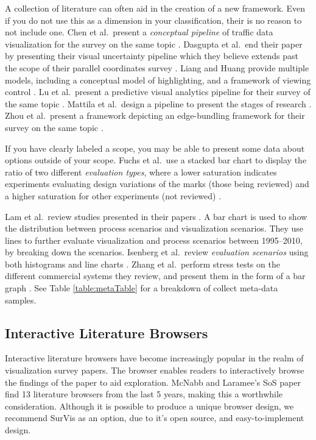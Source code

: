 A collection of literature can often aid in the creation of a new framework. Even if you do not use this as a dimension in your classification, their is no reason to not include one. Chen et al.\ present a \textit{conceptual pipeline} of traffic data visualization for the survey on the same topic \cite{chen2015survey}. Dasgupta et al.\ end their paper by presenting their visual uncertainty pipeline which they believe extends past the scope of their parallel coordinates survey \cite{dasgupta2012conceptualizing}. Liang and Huang provide multiple models, including a conceptual model of highlighting, and a framework of viewing control \cite{liang2010highlighting}. Lu et al.\  present a predictive visual analytics pipeline for their survey of the same topic \cite{lu2016recent}.  Mattila et al.\ design a pipeline to present the stages of research \cite{mattila2016software}. Zhou et al.\ present a framework depicting an edge-bundling framework for their survey on the same topic \cite{zhou2013edge}.

If you have clearly labeled a scope, you may be able to present some data about options outside of your scope. Fuchs et al.\ use a stacked bar chart to display the ratio of two different \textit{evaluation types}, where a lower saturation indicates experiments evaluating design variations of the marks (those being reviewed) and a higher saturation for other experiments (not reviewed) \cite{fuchs2016systematic}.

 Lam et al.\ review studies presented in their papers  \cite{lam2012empirical}. A bar chart is used to show the distribution between process scenarios and visualization scenarios. They use lines to further evaluate visualization and process scenarios between 1995--2010, by breaking down the scenarios.
Isenberg et al.\ review \textit{evaluation scenarios} using both histograms and line charts \cite{isenberg2013systematic}.
Zhang et al.\ perform stress tests on the different commercial systems they review, and present them in the form of a bar graph \cite{zhang2012visual}. See Table \ref{table:metaTable} for a breakdown of collect meta-data samples.


\subsection{Interactive Literature Browsers}
Interactive literature browsers have become increasingly popular in the realm of visualization survey papers. The browser enables readers to interactively browse the findings of the paper to aid exploration. McNabb and Laramee's SoS paper find 13 literature browsers from the last 5 years, making this a worthwhile consideration.  Although it is possible to produce a unique browser design, we recommend SurVis \cite{beck2016visual} as an option, due to it's open source, and easy-to-implement design.

